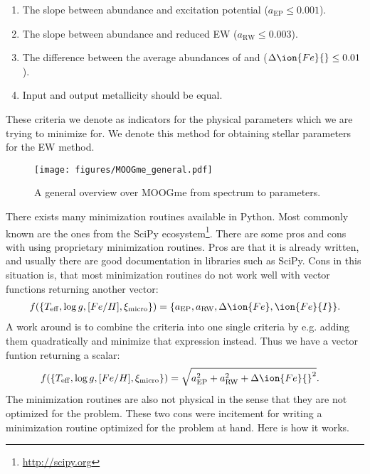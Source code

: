 \documentclass{aa}
\begin{document}
\begin{enumerate}
    \item The slope between abundance and excitation potential ($a_\mathrm{EP}\le0.001$).
    \item The slope between abundance and reduced EW ($a_\mathrm{RW}\le0.003$).
    \item The difference between the average abundances of  and
           ($\Delta\ion{Fe}{}\le0.01$).
    \item Input and output metallicity should be equal.
\end{enumerate}
These criteria we denote as indicators for the physical parameters which
we are trying to minimize for. We denote this method for obtaining stellar
parameters for the EW method.

\begin{figure}[tpb]
    \centering
    \texttt{[image: figures/MOOGme\_general.pdf]}
    \caption{A general overview over MOOGme from spectrum to parameters.}
    \label{fig:MOOGme_general}
\end{figure}

There exists many minimization routines available in Python. Most commonly
known are the ones from the SciPy ecosystem\footnote{\url{http://scipy.org}}.
There are some pros and cons with using proprietary minimization routines.
Pros are that it is already written, and usually there are good documentation
in libraries such as SciPy. Cons in this situation is, that most minimization
routines do not work well with vector functions returning another vector:
\begin{align}
    f(\{T_\mathrm{eff}, \log g, [Fe/H], \xi_\mathrm{micro}\}) = \{a_\mathrm{EP}, a_\mathrm{RW}, \Delta\ion{Fe}, \ion{Fe}{I}\}.
\end{align}
A work around is
to combine the criteria into one single criteria by e.g. adding them
quadratically and minimize that expression instead. Thus we have a vector
funtion returning a scalar:
\begin{align}
    f(\{T_\mathrm{eff}, \log g, [Fe/H], \xi_\mathrm{micro}\}) &= \sqrt{a_\mathrm{EP}^2 + a_\mathrm{RW}^2 + \Delta\ion{Fe}{}^2}.
\end{align}
The minimization routines
are also not physical in the sense that they are not optimized for the problem.
These two cons were incitement for writing a minimization routine optimized for the
problem at hand. Here is how it works.
\end{document}
